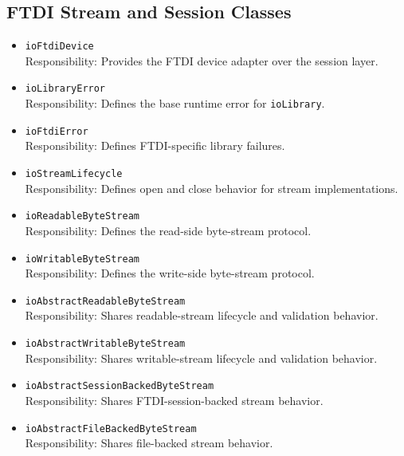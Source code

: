     \subsection{FTDI Stream and Session Classes}
    \begin{itemize}
        \item \texttt{ioFtdiDevice} \\
        Responsibility: Provides the FTDI device adapter over the session layer.

        \item \texttt{ioLibraryError} \\
        Responsibility: Defines the base runtime error for \texttt{ioLibrary}.

        \item \texttt{ioFtdiError} \\
        Responsibility: Defines FTDI-specific library failures.

        \item \texttt{ioStreamLifecycle} \\
        Responsibility: Defines open and close behavior for stream implementations.

        \item \texttt{ioReadableByteStream} \\
        Responsibility: Defines the read-side byte-stream protocol.

        \item \texttt{ioWritableByteStream} \\
        Responsibility: Defines the write-side byte-stream protocol.

        \item \texttt{ioAbstractReadableByteStream} \\
        Responsibility: Shares readable-stream lifecycle and validation behavior.

        \item \texttt{ioAbstractWritableByteStream} \\
        Responsibility: Shares writable-stream lifecycle and validation behavior.

        \item \texttt{ioAbstractSessionBackedByteStream} \\
        Responsibility: Shares FTDI-session-backed stream behavior.

        \item \texttt{ioAbstractFileBackedByteStream} \\
        Responsibility: Shares file-backed stream behavior.


\end{itemize}
